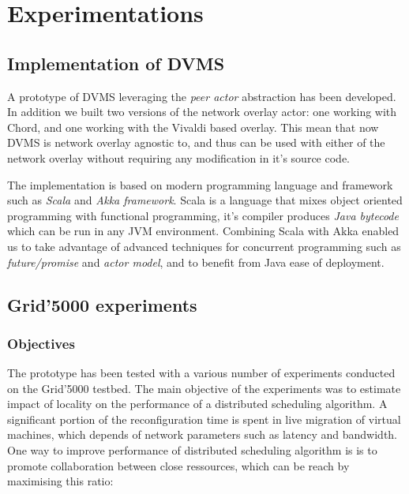 \section{Experimentations}

\subsection{Implementation of DVMS}

A prototype of DVMS leveraging the \emph{peer actor} abstraction has been 
developed. In addition we built two versions of the network overlay actor: one 
working with Chord, and one working with the Vivaldi based overlay. This mean 
that now DVMS is network overlay agnostic to, and thus can be used with either
of the network overlay without requiring any modification in it's source code.

The implementation is based on modern programming language and framework such as 
\emph{Scala} and \emph{Akka framework}. Scala is a language that mixes object
oriented programming with functional programming, it's compiler produces 
\emph{Java bytecode} which can be run in any JVM environment. Combining Scala 
with Akka enabled us to take advantage of advanced techniques for concurrent 
programming such as \emph{future/promise} and \emph{actor model}, and to benefit
from Java ease of deployment.



\subsection{Grid'5000 experiments}


\subsubsection{Objectives}
The prototype has been tested with a various number of experiments conducted on
the Grid'5000 testbed. The main objective of the experiments was to estimate
impact of locality on the performance of a distributed scheduling algorithm. 
A significant portion of the reconfiguration time is spent in live migration of
virtual machines, which depends of network parameters such as latency and
bandwidth. One way to improve performance of distributed scheduling algorithm is
is to promote collaboration between close ressources, which can be reach by 
maximising this ratio:

